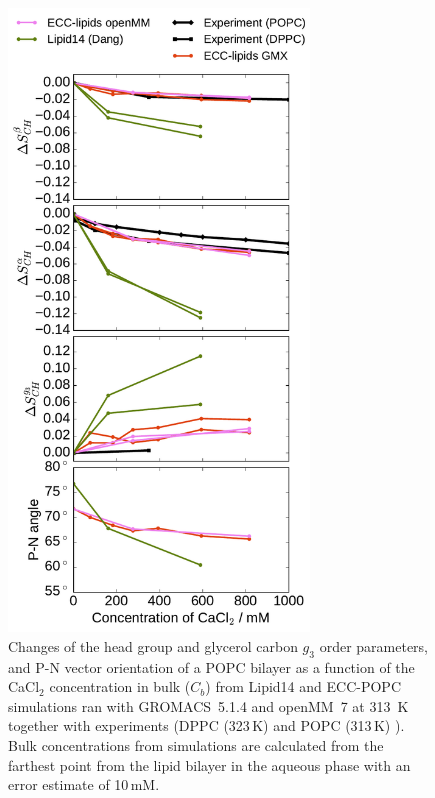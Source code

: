 \documentclass[journal=jpcbfk]{achemso}
\begin{document}
\begin{figure}[!p]
  \centering
  \includegraphics[width=8.0cm]{../Fig/ipython_nb/PN_angle_OrdPars-A-B-g3_L14-ECCL17_q80_sig89_CaCl_GMX-oMM_compar.pdf}
  \caption{\label{fig:ordPars_cacl_GMX_oMM_compar}
    Changes of the head group and glycerol carbon $g_3$ order parameters, and P-N vector orientation of a POPC bilayer 
    as a function of the CaCl$_2$ concentration in bulk ($C_b$)
    from Lipid14 \cite{dickson14} and ECC-POPC simulations ran
    with GROMACS~5.1.4 \cite{Abraham15} and openMM~7 \cite{openmm7} at 313~K
    together with experiments (DPPC (323\,K) \cite{akutsu81} and POPC (313\,K) \cite{altenbach84}). 
    Bulk concentrations from simulations are calculated 
    from the farthest point from the lipid bilayer in the aqueous phase
    with an error estimate of 10\,mM.
  }
\end{figure}



\newpage

\end{document}
